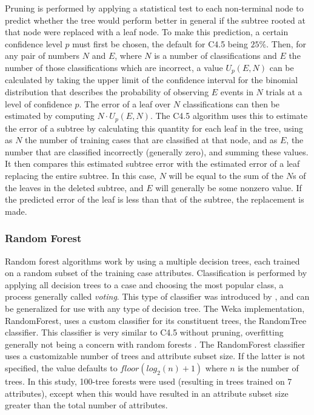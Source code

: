\documentclass[main.tex]{subfiles}
\begin{document}
Pruning is performed by applying a statistical test to each non-terminal node to predict whether the tree would perform better in general if the subtree rooted at that node were replaced with a leaf node. To make this prediction, a certain confidence level $p$ must first be chosen, the default for C4.5 being $25\%$. Then, for any pair of numbers $N$ and $E$, where $N$ is a number of classifications and $E$ the number of those classifications which are incorrect, a value $U_{p}(E,N)$ can be calculated by taking the upper limit of the confidence interval for the binomial distribution that describes the probability of observing $E$ events in $N$ trials at a level of confidence $p$. The error of a leaf over $N$ classifications can then be estimated by computing $N\cdot U_{p}(E,N)$. The C4.5 algorithm uses this to estimate the error of a subtree by calculating this quantity for each leaf in the tree, using as $N$ the number of training cases that are classified at that node, and as $E$, the number that are classified incorrectly (generally zero), and summing these values. It then compares this estimated subtree error with the estimated error of a leaf replacing the entire subtree. In this case, $N$ will be equal to the sum of the $N$s of the leaves in the deleted subtree, and $E$ will generally be some nonzero value. If the predicted error of the leaf is less than that of the subtree, the replacement is made.

\subsubsection{Random Forest}

Random forest algorithms work by using a multiple decision trees, each trained on a random subset of the training case attributes. Classification is performed by applying all decision trees to a case and choosing the most popular class, a process generally called \textit{voting}. This type of classifier was introduced by \citet{breiman:2001}, and can be generalized for use with any type of decision tree. The Weka implementation, RandomForest, uses a custom classifier for its constituent trees, the RandomTree classifier. This classifier is very similar to C4.5 without pruning, overfitting generally not being a concern with random forests \citep{breiman:2001}. The RandomForest classifier uses a customizable number of trees and attribute subset size. If the latter is not specified, the value defaults to $floor(log_2(n)+1)$ where $n$ is the number of trees. In this study, 100-tree forests were used (resulting in trees trained on 7 attributes), except when this would have resulted in an attribute subset size greater than the total number of attributes.


\biblio
\end{document}
